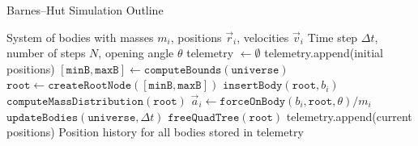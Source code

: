 \documentclass{article}
\begin{document}
\begin{algorithm}[H]
    \caption{Barnes–Hut Simulation Outline}\label{alg:bh}
    \begin{algorithmic}[1]
        \Require System of bodies with masses $m_i$, positions $\vec{r}_i$, velocities $\vec{v}_i$
        \Require Time step $\Delta t$, number of steps $N$, opening angle $\theta$
        \State telemetry $\gets \emptyset$
        \State telemetry.append(initial positions)
            \State $[\texttt{minB},\texttt{maxB}] \gets \texttt{computeBounds}(\texttt{universe})$
            \State $\texttt{root} \gets \texttt{createRootNode}([\texttt{minB},\texttt{maxB}])$
                \State $\texttt{insertBody}(\texttt{root}, b_i)$
            \EndFor
            \State $\texttt{computeMassDistribution}(\texttt{root})$
                \State $\vec{a}_i \gets \texttt{forceOnBody}(b_i,\texttt{root},\theta)/m_i$
            \EndFor
            \State $\texttt{updateBodies}(\texttt{universe}, \Delta t)$
            \State $\texttt{freeQuadTree}(\texttt{root})$
            \State telemetry.append(current positions)
        \EndFor
        \Ensure Position history for all bodies stored in telemetry
    \end{algorithmic}
\end{algorithm}
\end{document}
